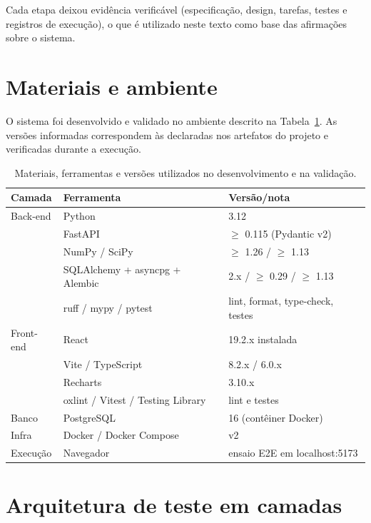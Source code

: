 Cada etapa deixou evidência verificável (especificação, design, tarefas,
testes e registros de execução), o que é utilizado neste texto como base das
afirmações sobre o sistema.

\section{Materiais e ambiente}

O sistema foi desenvolvido e validado no ambiente descrito na
Tabela~\ref{tab:ferramentas}. As versões informadas correspondem às
declaradas nos artefatos do projeto e verificadas durante a execução.

\begin{table}[htbp]
\centering
\caption{Materiais, ferramentas e versões utilizados no desenvolvimento e na validação.}
\label{tab:ferramentas}
\begin{tabular}{@{}lll@{}}
\toprule
\textbf{Camada} & \textbf{Ferramenta} & \textbf{Versão/nota} \\
\midrule
Back-end & Python & 3.12 \\
         & FastAPI & $\ge$ 0.115 (Pydantic v2) \\
         & NumPy / SciPy & $\ge$ 1.26 / $\ge$ 1.13 \\
         & SQLAlchemy + asyncpg + Alembic & 2.x / $\ge$ 0.29 / $\ge$ 1.13 \\
         & ruff / mypy / pytest & lint, format, type-check, testes \\
Front-end & React & 19.2.x instalada \\
          & Vite / TypeScript & 8.2.x / 6.0.x \\
          & Recharts & 3.10.x \\
          & oxlint / Vitest / Testing Library & lint e testes \\
Banco & PostgreSQL & 16 (contêiner Docker) \\
Infra & Docker / Docker Compose & v2 \\
Execução & Navegador & ensaio E2E em localhost:5173 \\
\bottomrule
\end{tabular}
\par{}
\end{table}

\section{Arquitetura de teste em camadas}

